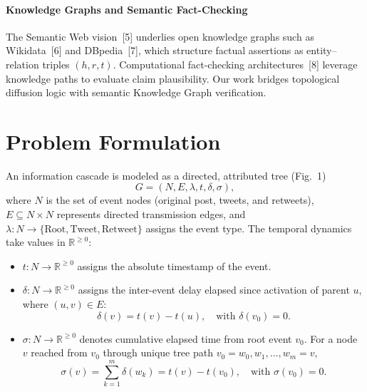 \documentclass[10pt,twocolumn,a4paper]{article}
\begin{document}
\paragraph{Knowledge Graphs and Semantic Fact-Checking}
The Semantic Web vision~[5] underlies open knowledge graphs such as Wikidata~[6] and DBpedia~[7], which structure factual assertions as entity--relation triples $(h,r,t)$. Computational fact-checking architectures~[8] leverage knowledge paths to evaluate claim plausibility. Our work bridges topological diffusion logic with semantic Knowledge Graph verification.
 
\section{Problem Formulation}
An information cascade is modeled as a directed, attributed tree (Fig.~1)
\begin{equation}
G = (N, E, \lambda, t, \delta, \sigma),
\end{equation}
where $N$ is the set of event nodes (original post, tweets, and retweets), $E \subseteq N \times N$ represents directed transmission edges, and $\lambda : N \to \{\mathrm{Root}, \mathrm{Tweet}, \mathrm{Retweet}\}$ assigns the event type. The temporal dynamics take values in $\mathbb{R}^{\ge 0}$:
\begin{itemize}
  \item $t : N \to \mathbb{R}^{\ge 0}$ assigns the absolute timestamp of the event.
  \item $\delta : N \to \mathbb{R}^{\ge 0}$ assigns the inter-event delay elapsed since activation of parent $u$, where $(u,v)\in E$:
  \begin{equation}
  \delta(v) = t(v) - t(u), \quad \text{with } \delta(v_0) = 0.
  \end{equation}
  \item $\sigma : N \to \mathbb{R}^{\ge 0}$ denotes cumulative elapsed time from root event $v_0$. For a node $v$ reached from $v_0$ through unique tree path $v_0 = w_0, w_1, \dots, w_m = v$,
  \begin{equation}
  \sigma(v) = \sum_{k=1}^{m} \delta(w_k) = t(v) - t(v_0), \quad \text{with } \sigma(v_0) = 0.
  \end{equation}
\end{itemize}
 
\end{document}
